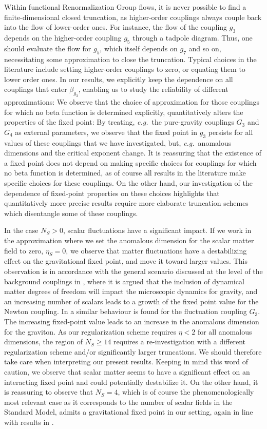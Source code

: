\documentclass[11pt]{book}
\newcommand\eg{\textit{e.g.}\ }
\numberwithin{equation}{chapter}
\begin{document}
Within functional Renormalization Group flows, it is never possible to find a finite-dimensional
closed truncation, as higher-order couplings always couple back into the flow of lower-order ones.
For instance, the flow of the coupling $g_3$ depends on the higher-order coupling $g_5$ through
a tadpole diagram. Thus, one should evaluate the flow for $g_5$,
which itself depends on $g_7$ and so on, necessitating some approximation to close the truncation.
Typical choices in the literature include setting higher-order couplings to zero,
or equating them to lower order ones. In our results,
we explicitly keep the dependence on all couplings that enter $\beta_{g_3}$,
enabling us to study the reliability of different approximations:
We observe that the choice of approximation for those couplings for which no beta function is
determined explicitly, quantitatively alters the properties of the fixed point: By treating,
\eg the pure-gravity couplings $G_3$ and $G_4$ as external parameters, we observe that the
fixed point in $g_3$ persists for all values of these couplings that we have investigated,
but, \eg anomalous dimensions and the critical exponent change.
It is reassuring that the existence of a fixed point does not  depend on making specific choices
for couplings for which no beta function is determined, as of course all results in the literature
make specific choices for these couplings. On the other hand,
our investigation of the dependence of fixed-point properties on these choices highlights that quantitatively
more precise results require
 more elaborate truncation schemes which disentangle some of these couplings.


In the case $N_S>0$, scalar fluctuations have a significant impact.
If we work in the approximation where we set the anomalous dimension for the scalar matter field to zero,
$\eta_S=0$, we observe that matter fluctuations  have a destabilizing effect on the gravitational fixed point,
and move it toward larger values.
This observation is in accordance with the general scenario discussed at the level of the
background couplings in \cite{Dona:2013qba, Dona:2014pla},
where it is argued that the inclusion of dynamical matter degrees of freedom will impact
the microscopic dynamics for gravity, and an increasing number of scalars leads to a growth of the
fixed point value for the Newton coupling. In \cite{Meibohm:2015twa} a similar behaviour
is found for the fluctuation coupling $G_3$.
The increasing fixed-point value leads to an increase in the anomalous dimension for the graviton.
As our regularization scheme requires $\eta<2$ for all anomalous dimensions,
the region of $N_S \geq 14$ requires a re-investigation with a different regularization
scheme and/or significantly larger truncations.
We should therefore take care when interpreting our present results.
Keeping in mind this word of caution, we observe that scalar matter seems to have a significant
effect on an interacting fixed point and could potentially destabilize it.
On the other hand, it is reassuring to observe that $N_S=4$,
which is of course the phenomenologically most relevant case as it corresponds to the number of
scalar fields in the Standard Model,
admits a gravitational fixed point in our setting,
again in line with results in \cite{Dona:2013qba, Dona:2014pla, Meibohm:2015twa}.
\end{document}
